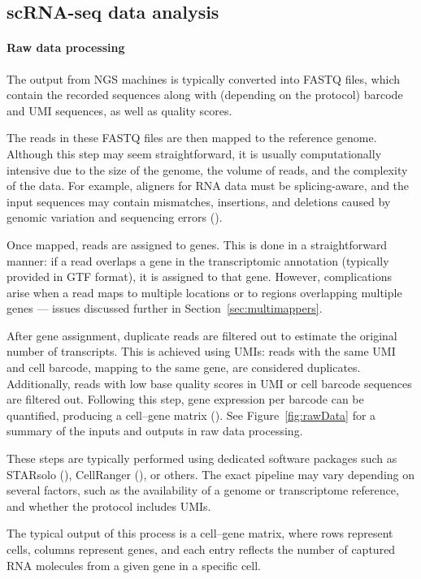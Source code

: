 \subsection{scRNA-seq data analysis}

\paragraph{Raw data processing}
The output from NGS machines is typically converted into FASTQ files,
which contain the recorded sequences along with (depending on the protocol) barcode and UMI sequences, as well as quality scores.

The reads in these FASTQ files are then mapped to the reference genome.
Although this step may seem straightforward, it is usually computationally intensive due to the size of the genome,
the volume of reads, and the complexity of the data.
For example, aligners for RNA data must be splicing-aware, and the input sequences may contain mismatches, insertions,
and deletions caused by genomic variation and sequencing errors (\cite{Dobin2012}).

Once mapped, reads are assigned to genes.
This is done in a straightforward manner:
if a read overlaps a gene in the transcriptomic annotation (typically provided in GTF format), it is assigned to that gene.
However, complications arise when a read maps to multiple locations or to regions overlapping multiple genes —
issues discussed further in Section~\ref{sec:multimappers}.

After gene assignment, duplicate reads are filtered out to estimate the original number of transcripts.
This is achieved using UMIs: reads with the same UMI and cell barcode, mapping to the same gene, are considered duplicates.
Additionally, reads with low base quality scores in UMI or cell barcode sequences are filtered out.
Following this step, gene expression per barcode can be quantified, producing a cell–gene matrix (\cite{Heumos2023}).
See Figure~\ref{fig:rawData} for a summary of the inputs and outputs in raw data processing.

These steps are typically performed using dedicated software packages
such as STARsolo (\cite{Kaminow2021}), CellRanger (\cite{Zheng2017}), or others.
The exact pipeline may vary depending on several factors, such as the availability of a genome or transcriptome reference,
and whether the protocol includes UMIs.

The typical output of this process is a cell–gene matrix, where rows represent cells, columns represent genes,
and each entry reflects the number of captured RNA molecules from a given gene in a specific cell.

